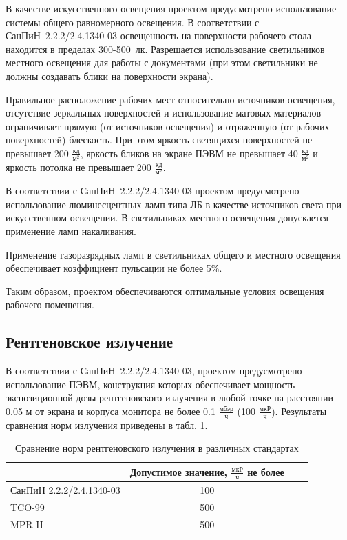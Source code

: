 В качестве искусственного освещения проектом предусмотрено использование системы общего равномерного освещения. В соответствии с СанПиН~2.2.2/2.4.1340-03  освещенность на поверхности рабочего стола находится в пределах 300-500~лк. Разрешается использование светильников местного освещения для работы с документами (при этом светильники не должны создавать блики на поверхности экрана).

Правильное расположение рабочих мест относительно источников освещения, отсутствие зеркальных поверхностей и использование матовых материалов ограничивает прямую (от источников освещения) и отраженную (от рабочих поверхностей) блескость. При этом яркость светящихся поверхностей не превышает 200 $\frac{\text{кд}}{\text{м}^2}$, яркость бликов на экране ПЭВМ не превышает 40 $\frac{\text{кд}}{\text{м}^2}$ и яркость потолка не превышает 200 $\frac{\text{кд}}{\text{м}^2}$.

В соответствии с СанПиН~2.2.2/2.4.1340-03  проектом предусмотрено использование люминесцентных ламп типа ЛБ в качестве источников света при искусственном освещении. В светильниках местного освещения допускается применение ламп накаливания.

Применение газоразрядных ламп в светильниках общего и местного освещения обеспечивает коэффициент пульсации не более 5\%.

Таким образом, проектом обеспечиваются оптимальные условия освещения рабочего помещения.

\subsection{Рентгеновское излучение}
В соответствии с СанПиН~2.2.2/2.4.1340-03, проектом предусмотрено использование ПЭВМ, конструкция которых обеспечивает мощность экспозиционной дозы рентгеновского излучения в любой точке на расстоянии 0.05 м от экрана и корпуса монитора не более 0.1 $\frac{\text{мбэр}}{\text{ч}}$ (100 $\frac{\text{мкР}}{\text{ч}}$). Результаты сравнения норм излучения приведены в табл. \ref{tab:rentgenNorm}.

\begin{table}[ht]
  \center
  \caption{Сравнение норм рентгеновского излучения в различных стандартах}
  \begin{tabular}{|l|c|c|c|}
  \hline
  \multicolumn{1}{|p{0.3\textwidth}|}{}
  & \multicolumn{1}{|p{0.3\textwidth}|}{\centering Допустимое значение, $\frac{\text{мкР}}{\text{ч}}$ не более} \\
  \hline
  СанПиН 2.2.2/2.4.1340-03 & 100 \\
  \hline
  TCO-99                   & 500 \\
  \hline
  MPR II                   & 500 \\
  \hline
  \end{tabular}
  \label{tab:rentgenNorm}
\end{table}

